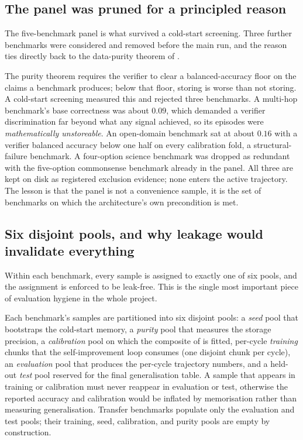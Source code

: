 \subsection*{The panel was pruned for a principled reason}

The five-benchmark panel is what survived a cold-start screening. Three further
benchmarks were considered and removed before the main run, and the reason ties
directly back to the data-purity theorem of .

\begin{bythenumbers}
The purity theorem requires the verifier to clear a balanced-accuracy floor on the
claims a benchmark produces; below that floor, storing is worse than not storing. A
cold-start screening measured this and rejected three benchmarks. A multi-hop
benchmark's base correctness was about $0.09$, which demanded a verifier
discrimination far beyond what any signal achieved, so its episodes were
\emph{mathematically unstoreable}. An open-domain benchmark sat at about $0.16$ with
a verifier balanced accuracy below one half on every calibration fold, a
structural-failure benchmark. A four-option science benchmark was dropped as
redundant with the five-option commonsense benchmark already in the panel. All three
are kept on disk as registered exclusion evidence; none enters the active
trajectory. The lesson is that the panel is not a convenience sample, it is the set
of benchmarks on which the architecture's own precondition is met.
\end{bythenumbers}

\subsection*{Six disjoint pools, and why leakage would invalidate everything}

Within each benchmark, every sample is assigned to exactly one of six pools, and the
assignment is enforced to be leak-free. This is the single most important piece of
evaluation hygiene in the whole project.

\begin{precise}
Each benchmark's samples are partitioned into six disjoint pools: a \emph{seed} pool
that bootstraps the cold-start memory, a \emph{purity} pool that measures the
storage precision, a \emph{calibration} pool on which the composite of
 is fitted, per-cycle \emph{training} chunks that the
self-improvement loop consumes (one disjoint chunk per cycle), an \emph{evaluation}
pool that produces the per-cycle trajectory numbers, and a held-out \emph{test} pool
reserved for the final generalisation table. A sample that appears in training or
calibration must never reappear in evaluation or test, otherwise the reported
accuracy and calibration would be inflated by memorisation rather than measuring
generalisation. Transfer benchmarks populate only the evaluation and test pools;
their training, seed, calibration, and purity pools are empty by construction.
\end{precise}

